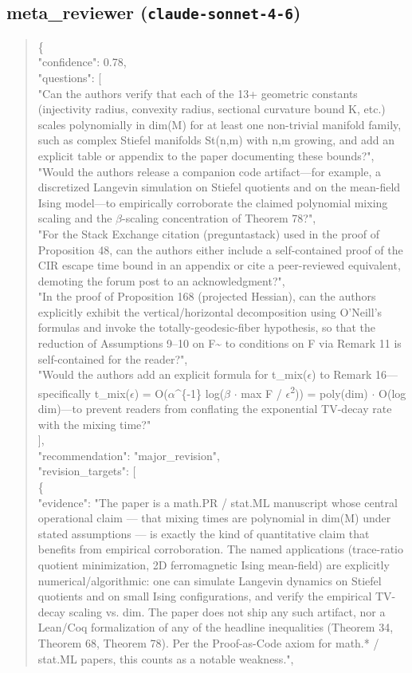 \documentclass[11pt]{article}
\begin{document}
\subsection*{meta\_reviewer (\texttt{claude-sonnet-4-6})}
\begin{quote}\small\ttfamily\raggedright
\{\\
  "confidence": 0.78,\\
  "questions": [\\
    "Can the authors verify that each of the 13+ geometric constants (injectivity radius, convexity radius, sectional curvature bound K, etc.) scales polynomially in dim(M) for at least one non-trivial manifold family, such as complex Stiefel manifolds St(n,m) with n,m growing, and add an explicit table or appendix to the paper documenting these bounds?",\\
    "Would the authors release a companion code artifact---for example, a discretized Langevin simulation on Stiefel quotients and on the mean-field Ising model---to empirically corroborate the claimed polynomial mixing scaling and the \ensuremath{\beta}-scaling concentration of Theorem 78?",\\
    "For the Stack Exchange citation (preguntastack) used in the proof of Proposition 48, can the authors either include a self-contained proof of the CIR escape time bound in an appendix or cite a peer-reviewed equivalent, demoting the forum post to an acknowledgment?",\\
    "In the proof of Proposition 168 (projected Hessian), can the authors explicitly exhibit the vertical/horizontal decomposition using O'Neill's formulas and invoke the totally-geodesic-fiber hypothesis, so that the reduction of Assumptions 9--10 on F\~{} to conditions on F via Remark 11 is self-contained for the reader?",\\
    "Would the authors add an explicit formula for t\_mix(\ensuremath{\epsilon}) to Remark 16---specifically t\_mix(\ensuremath{\epsilon}) = O(\ensuremath{\alpha}\^{}\{-1\} log(\ensuremath{\beta} \ensuremath{\cdot} max F / \ensuremath{\epsilon}\textsuperscript{2})) = poly(dim) \ensuremath{\cdot} O(log dim)---to prevent readers from conflating the exponential TV-decay rate with the mixing time?"\\
  ],\\
  "recommendation": "major\_revision",\\
  "revision\_targets": [\\
    \{\\
      "evidence": "The paper is a math.PR / stat.ML manuscript whose central operational claim --- that mixing times are polynomial in dim(M) under stated assumptions --- is exactly the kind of quantitative claim that benefits from empirical corroboration. The named applications (trace-ratio quotient minimization, 2D ferromagnetic Ising mean-field) are explicitly numerical/algorithmic: one can simulate Langevin dynamics on Stiefel quotients and on small Ising configurations, and verify the empirical TV-decay scaling vs. dim. The paper does not ship any such artifact, nor a Lean/Coq formalization of any of the headline inequalities (Theorem 34, Theorem 68, Theorem 78). Per the Proof-as-Code axiom for math.* / stat.ML papers, this counts as a notable weakness.",\\

\end{quote}
\end{document}
